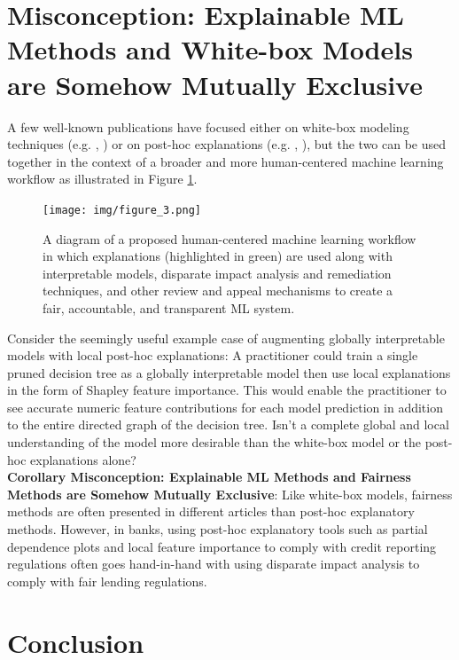 \documentclass[fleqn]{article}
\begin{document}
\section{Misconception: Explainable ML Methods and White-box Models are Somehow Mutually Exclusive} \label{sec:white_box}

A few well-known publications have focused either on white-box modeling techniques (e.g. \cite{slim}, \cite{sbrl}) or on post-hoc explanations (e.g. \cite{lime}, \cite{shapley}), but the two can be used together in the context of a broader and more human-centered machine learning workflow as illustrated in Figure \ref{fig:hc_ml}. 

\begin{figure}[htb]
	\begin{center}
		\texttt{[image: img/figure\_3.png]}
		\caption{A diagram of a proposed human-centered machine learning workflow in which explanations (highlighted in green) are used along with interpretable models, disparate impact analysis and remediation techniques, and other review and appeal mechanisms to create a fair, accountable, and transparent ML system.}
		\label{fig:hc_ml}
	\end{center}
\end{figure}	

Consider the seemingly useful example case of augmenting globally interpretable models with local post-hoc explanations: A practitioner could train a single pruned decision tree as a globally interpretable model then use local explanations in the form of Shapley feature importance. This would enable the practitioner to see accurate numeric feature contributions for each model prediction in addition to the entire directed graph of the decision tree. Isn't a complete global and local understanding of the model more desirable than the white-box model or the post-hoc explanations alone?\\ 

\textbf{Corollary Misconception: Explainable ML Methods and Fairness Methods are Somehow Mutually Exclusive}: Like white-box models, fairness methods are often presented in different articles than post-hoc explanatory methods. However, in banks, using post-hoc explanatory tools such as partial dependence plots and local feature importance to comply with credit reporting regulations often goes hand-in-hand with using disparate impact analysis to comply with fair lending regulations. 

\section*{Conclusion}
\end{document}
